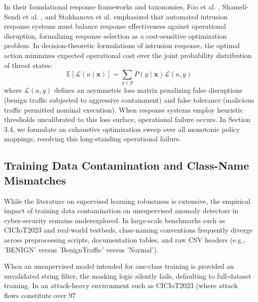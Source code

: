\documentclass[journal,10pt,onecolumn]{IEEEtran}
\begin{document}
In their foundational response frameworks and taxonomies, Foo et al. \cite{25}, Shameli-Sendi et al. \cite{26}, and Stakhanova et al. \cite{27} emphasized that automated intrusion response systems must balance response effectiveness against operational disruption, formalizing response selection as a cost-sensitive optimization problem. In decision-theoretic formulations of intrusion response, the optimal action minimizes expected operational cost over the joint probability distribution of threat states:
$$\mathbb{E}[\mathcal{L}(a \mid \mathbf{x})] = \sum_{y \in \mathcal{Y}} P(y \mid \mathbf{x}) \mathcal{L}(a, y)$$
where $\mathcal{L}(a, y)$ defines an asymmetric loss matrix penalizing false disruptions (benign traffic subjected to aggressive containment) and false tolerance (malicious traffic permitted nominal execution). When response systems employ heuristic thresholds uncalibrated to this loss surface, operational failure occurs. In Section 3.4, we formulate an exhaustive optimization sweep over all monotonic policy mappings, resolving this long-standing operational failure.


\subsection{Training Data Contamination and Class-Name Mismatches}
While the literature on supervised learning robustness is extensive, the empirical impact of training data contamination on unsupervised anomaly detectors in cyber-security remains underexplored. In large-scale benchmarks such as CICIoT2023 \cite{3} and real-world testbeds, class-naming conventions frequently diverge across preprocessing scripts, documentation tables, and raw CSV headers (e.g., 'BENIGN' versus 'BenignTraffic' versus 'Normal').

When an unsupervised model intended for one-class training is provided an unvalidated string filter, the masking logic silently fails, defaulting to full-dataset training. In an attack-heavy environment such as CICIoT2023 (where attack flows constitute over 97%
\end{document}
